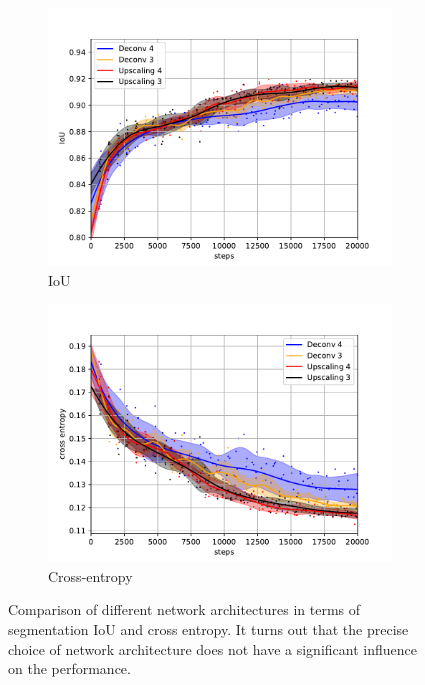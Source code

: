 \documentclass[aps,prl,twocolumn,groupedaddress,amsmath,amssymb]{revtex4-1}
\begin{document}
    \begin{figure}[tbp]
        \begin{subfigure}[c]{\linewidth}
            \includegraphics[width=\linewidth]{figures/arch.pdf}
            \caption{IoU}
        \end{subfigure}
        \begin{subfigure}[c]{\linewidth}
            \includegraphics[width=\linewidth]{figures/arch_xent.pdf}
            \caption{Cross-entropy}
        \end{subfigure}
        \caption{Comparison of different network architectures in terms of segmentation IoU and
        cross entropy. It turns out that the precise choice of network architecture does not 
        have a significant influence on the performance.}
        \label{fig:arch}
    \end{figure}
\end{document}
